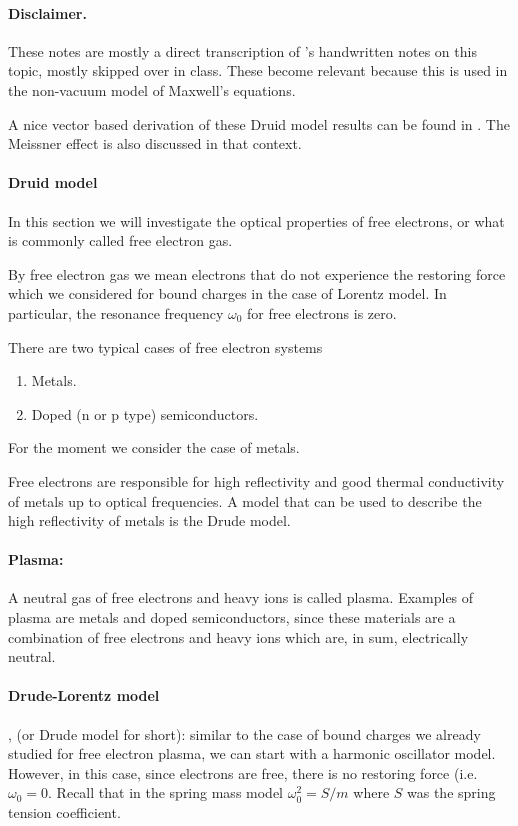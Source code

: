 \paragraph{Disclaimer.}

These notes are mostly a direct transcription of \mo's handwritten notes on this topic, mostly skipped over in class.  These become relevant because this is used in the non-vacuum model of Maxwell's equations.

A nice vector based derivation of these Druid model results can be found in \citep{ashcroft1976solid}.  The Meissner effect is also discussed in that context.

\paragraph{Druid model}

In this section we will investigate the optical properties of free electrons, or what is commonly called free electron gas.

By free electron gas we mean electrons that do not experience the restoring force which we considered for bound charges in the case of Lorentz model.  In particular, the resonance frequency \( \omega_0 \) for free electrons is zero.

There are two typical cases of free electron systems

\begin{enumerate}[a]
\item Metals.
\item Doped (n or p type) semiconductors.
\end{enumerate}

For the moment we consider the case of metals.

Free electrons are responsible for high reflectivity and good thermal conductivity of metals up to optical frequencies.  A model that can be used to describe the high reflectivity of metals is the Drude model.

\paragraph{Plasma:} A neutral gas of free electrons and heavy ions is called plasma.  Examples of plasma are metals and doped semiconductors, since these materials are a combination of free electrons and heavy ions which are, in sum, electrically neutral.

\paragraph{Drude-Lorentz model}, (or Drude model for short): similar to the case of bound charges we already studied for free electron plasma, we can start with a harmonic oscillator model.  However, in this case, since electrons are free, there is no restoring force (i.e. \(\omega_0 = 0 \).  Recall that in the spring mass model \( \omega_0^2 = S/m \) where \( S \) was the spring tension coefficient.

